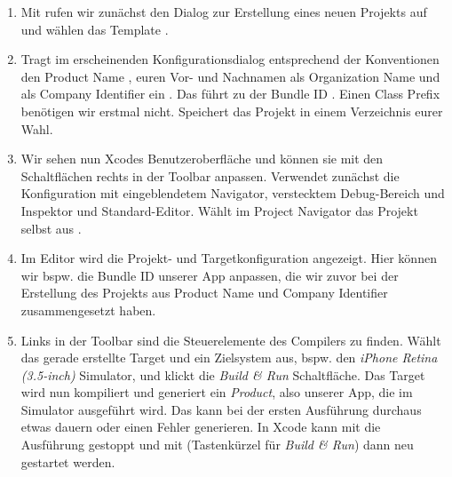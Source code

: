 \documentclass[parskip=half, final]{scrreprt}
\begin{document}
\begin{enumerate}

\item Mit  rufen wir zunächst den Dialog zur Erstellung eines neuen Projekts auf und wählen das Template .

\item Tragt im erscheinenden Konfigurationsdialog entsprechend der Konventionen den Product Name , euren Vor- und Nachnamen als Organization Name und  als Company Identifier ein . Das führt zu der Bundle ID . Einen Class Prefix benötigen wir erstmal nicht. Speichert das Projekt in einem Verzeichnis eurer Wahl.


\item Wir sehen nun Xcodes Benutzeroberfläche und können sie mit den Schaltflächen rechts in der Toolbar anpassen. Verwendet zunächst die Konfiguration mit eingeblendetem Navigator, verstecktem Debug-Bereich und Inspektor und Standard-Editor. Wählt im Project Navigator das Projekt selbst aus .


\item Im Editor wird die Projekt- und Targetkonfiguration angezeigt. Hier können wir bspw. die Bundle ID unserer App anpassen, die wir zuvor bei der Erstellung des Projekts aus Product Name und Company Identifier zusammengesetzt haben.

\item Links in der Toolbar sind die Steuerelemente des Compilers zu finden. Wählt das gerade erstellte Target und ein Zielsystem aus, bspw. den \emph{iPhone Retina (3.5-inch)} Simulator, und klickt die \emph{Build \& Run} Schaltfläche. Das Target wird nun kompiliert und generiert ein \emph{Product}, also unserer App, die im Simulator ausgeführt wird. Das kann bei der ersten Ausführung durchaus etwas dauern oder einen Fehler generieren. In Xcode kann mit  die Ausführung gestoppt und mit  (Tastenkürzel für \emph{Build \& Run}) dann neu gestartet werden.

\end{enumerate}
\end{document}
